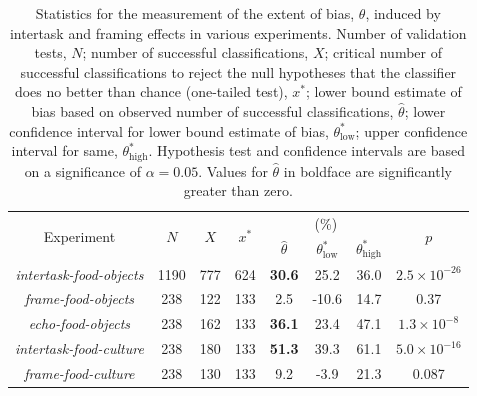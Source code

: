 \documentclass[12pt]{article}
\begin{document}
\begin{table}
\begin{center}
\begin{tabular}{c c c c c c c c }
	\toprule
	\multirow{2}{*}{Experiment} & \multirow{2}{*}{$N$} & 
	\multirow{2}{*}{$X$} & \multirow{2}{*}{$x^*$} & \multicolumn{3}{c}{(\%)}
		& \multirow{2}{*}{$p$}\\ \cline{5-7} \noalign{\smallskip}
	& & & & $\hat{\theta}$ & $\theta^*_\mathrm{low}$ 
		& $\theta^*_\mathrm{high}$  \\
	\midrule
	\textit{intertask-food-objects} & 1190 & 777 & 624 & \textbf{30.6} 
		& 25.2 & 36.0 & $2.5 \times 10^{-26}$ \\
	\textit{frame-food-objects} & 238 & 122 & 133 & 2.5 & -10.6 & 14.7
		& 0.37 \\
	\textit{echo-food-objects} & 238 & 162 &  133 & \textbf{36.1} & 23.4 
		& 47.1 & $1.3 \times 10^{-8}$ \\
	\textit{intertask-food-culture} & 238 & 180 & 133 & \textbf{51.3} & 39.3 
		& 61.1 & $5.0 \times 10^{-16}$ \\
	\textit{frame-food-culture} & 238 & 130 & 133 & 9.2 & -3.9 & 21.3 
		& 0.087\\
	\bottomrule

\end{tabular}

\caption{Statistics for the measurement of the extent of bias, $\theta$,
	induced by intertask and framing effects in various experiments.
	Number of validation tests, $N$; number of successful classifications, 
	$X$; critical number of successful classifications to reject the null 
	hypotheses that the classifier does no better than chance 
	(one-tailed test), $x^*$; 
	lower bound estimate of bias based on observed number of successful
	classifications, $\hat{\theta}$; lower confidence interval for lower
	bound estimate of bias, $\theta^*_\mathrm{low}$; upper confidence 
	interval for same, $\theta^*_\mathrm{high}$.  Hypothesis test and 
	confidence intervals are based on a significance of $\alpha=0.05$.
	Values for $\hat{\theta}$ in boldface are significantly greater than zero.
}
\label{table:theta}
\end{center}
\end{table}
\end{document}
